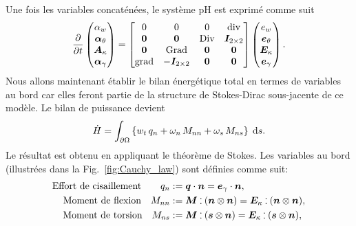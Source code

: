 Une fois les variables concaténées, le système pH est exprimé comme suit
\begin{equation*}
\diffp{}{t}
\begin{pmatrix}
\alpha_w \\
\bm\alpha_\theta \\
\bm{A}_\kappa \\
\bm\alpha_{\gamma} \\
\end{pmatrix} = 
\begin{bmatrix}
0  & 0  & 0  & \div \\
\bm{0} & \bm{0} &  \Div & \bm{I}_{2 \times 2}\\
\bm{0}  & \Grad  & \bm{0}  & \bm{0}\\
\grad & -\bm{I}_{2 \times 2} &  \bm{0} & \bm{0} \\
\end{bmatrix}
\begin{pmatrix}
e_w \\
\bm{e}_{\theta} \\
\bm{E}_{\kappa} \\
\bm{e}_{\gamma} \\
\end{pmatrix}.
\end{equation*}
Nous allons maintenant établir le bilan énergétique total en termes de variables au bord car elles feront partie de la structure de Stokes-Dirac sous-jacente de ce modèle. Le bilan de puissance devient
\begin{equation*}
\dot{H}= \int_{\partial \Omega} \left\{ w_t \, q_n  + \omega_n \, M_{nn} + \omega_s \, M_{ns} \right\} \d{s}.
\end{equation*}
Le résultat est obtenu en appliquant le théorème de Stokes. Les variables au bord (illustrées dans la Fig.~\ref{fig:Cauchy_law}) sont définies comme suit:
\begin{equation*}
\begin{aligned}
\text{Effort de cisaillement}  \qquad q_{n} &:= \bm{q} \cdot \bm{n}=  \bm{e}_{\gamma} \cdot \bm{n},  \\
\text{Moment de flexion} \quad 
M_{nn} &:=  \bm{M} \cddot (\bm{n}\otimes{\bm{n}}) = \bm{E}_{\kappa} \cddot (\bm{n}\otimes{\bm{n}}), 	\\
\text{Moment de torsion} \quad M_{ns} &:= \bm{M} \cddot (\bm{s}\otimes{\bm{n}}) = \bm{E}_{\kappa} \cddot (\bm{s}\otimes{\bm{n}}),	
\end{aligned}
\end{equation*}

